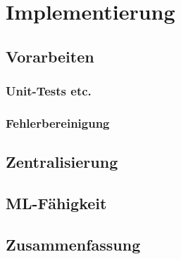 \chapter{Implementierung}



\section{Vorarbeiten}
\subsection{Unit-Tests etc.}
\subsection{Fehlerbereinigung}

\section{Zentralisierung}

\section{ML-Fähigkeit}



\section{Zusammenfassung}



